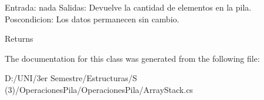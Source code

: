 Entrada\+: nada Salidas\+: Devuelve la cantidad de elementos en la pila. Poscondicion\+: Los datos permanecen sin cambio. 

\begin{DoxyReturn}{Returns}

\end{DoxyReturn}


The documentation for this class was generated from the following file\+:\begin{DoxyCompactItemize}
\item 
D\+:/\+U\+N\+I/3er Semestre/\+Estructuras/\+S (3)/\+Operaciones\+Pila/\+Operaciones\+Pila/Array\+Stack.\+cs\end{DoxyCompactItemize}
